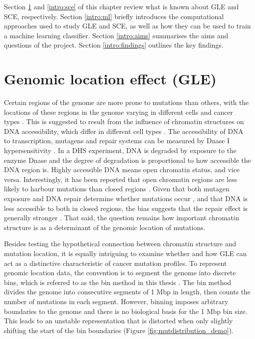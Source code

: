 Section \ref{intro:gle} and \ref{intro:sce} of this chapter review what is known about GLE and SCE, respectively. Section \ref{intro:ml} briefly introduces the computational approaches used to study GLE and SCE, as well as how they can be used to train a machine learning classifier. Section \ref{intro:aims} summarises the aims and questions of the project. Section \ref{intro:findings} outlines the key findings.

\section{Genomic location effect (GLE)}
\label{intro:gle}
Certain regions of the genome are more prone to mutations than others, with the locations of these regions in the genome varying in different cells and cancer types \citep{Polak2015, Jiao2020}. This is suggested to result from the influence of chromatin structures on DNA accessibility, which differ in different cell types \citep{Abascal2020ExpandedGenomes}. The accessibility of DNA to transcription, mutagens and repair systems can be measured by Dnase I hypersensitivity \citep[DHS;][]{Liu2019AApplications}. In a DHS experiment, DNA is degraded by exposure to the enzyme Dnase and the degree of degradation is proportional to how accessible the DNA region is. Highly accessible DNA means open chromatin status, and vice versa. Interestingly, it has been reported that open chromatin regions are less likely to harbour mutations than closed regions \citep{Polak2015,Prendergast2007ChromatinGenome}. Given that both \gls{mutagen} exposure and DNA repair determine whether mutations occur \citep{Ripley2001Mutation}, and that DNA is less accessible to both in closed regions, the bias suggests that the repair effect is generally stronger \citep[Figure \ref{fig:chromatin_demo};][]{Teng1997ExcisionSequences, Morse2002PhotoreactivationCerevisiae}. That said, the question remains how important chromatin structure is as a determinant of the genomic location of mutations. 



Besides testing the hypothetical connection between chromatin structure and mutation location, it is equally intriguing to examine whether and how GLE can act as a distinctive characteristic of cancer mutation profiles. To represent genomic location data, the convention is to segment the genome into discrete bins, which is referred to as the bin method in this thesis \citep{Kubler2019, Salvadores2019PassengerTumors, Chalmers2017AnalysisBurden, Salvadores2020MatchingPatterns}. The bin method divides the genome into consecutive segments of 1 Mbp in length, then counts the number of mutations in each segment. However, binning imposes arbitrary boundaries to the genome and there is no biological basis for the 1 Mbp bin size. This leads to an unstable representation that is distorted when only slightly shifting the start of the bin boundaries (Figure \ref{fig:mutdistribution_demo}). 

